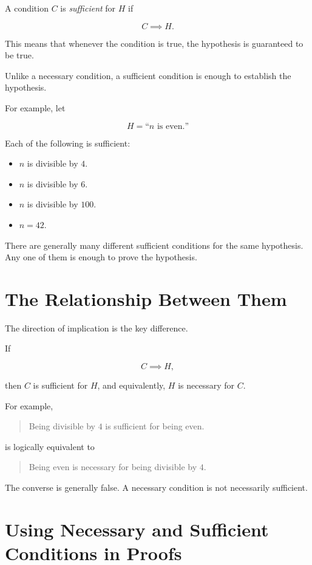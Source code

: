 \documentclass{essay}
\begin{document}
A condition $C$ is \emph{sufficient} for $H$ if

\[
C \implies H.
\]

This means that whenever the condition is true, the hypothesis is guaranteed to be true.

Unlike a necessary condition, a sufficient condition is enough to establish the hypothesis.

For example, let

\[
H = \text{``$n$ is even.''}
\]

Each of the following is sufficient:

\begin{itemize}
\item $n$ is divisible by $4$.
\item $n$ is divisible by $6$.
\item $n$ is divisible by $100$.
\item $n = 42$.
\end{itemize}

There are generally many different sufficient conditions for the same hypothesis. Any one of them is enough to prove the hypothesis.

\section*{The Relationship Between Them}

The direction of implication is the key difference.

If

\[
C \implies H,
\]

then $C$ is sufficient for $H$, and equivalently, $H$ is necessary for $C$.

For example,

\begin{quote}
Being divisible by $4$ is sufficient for being even.
\end{quote}

is logically equivalent to

\begin{quote}
Being even is necessary for being divisible by $4$.
\end{quote}

The converse is generally false. A necessary condition is not necessarily sufficient.

\section*{Using Necessary and Sufficient Conditions in Proofs}
\end{document}
